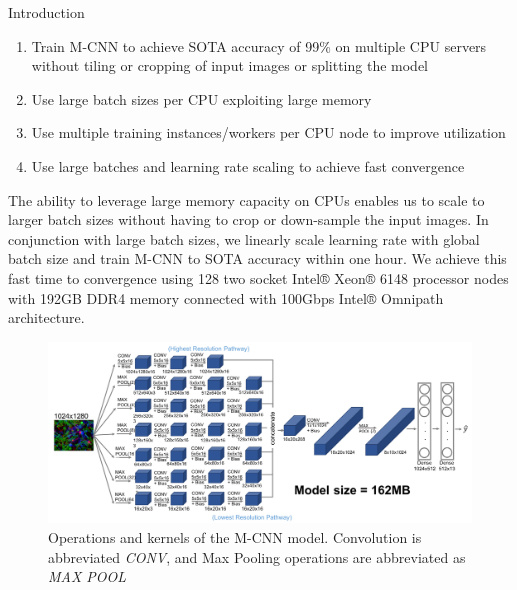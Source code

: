 \begin{section}{Introduction}
\begin{enumerate}
	\item Train M-CNN to achieve SOTA accuracy of 99\% on multiple CPU servers without tiling or cropping of input images or splitting the model
	\item Use large batch sizes per CPU exploiting large memory
	\item Use multiple training instances/workers per CPU node to improve utilization
	\item Use large batches and learning rate scaling to achieve fast convergence
\end{enumerate}

\noindent The ability to leverage large memory capacity on CPUs enables us to scale to larger batch sizes without having to crop or down-sample the input images. In conjunction with large batch sizes, we linearly scale learning rate with global batch size and train M-CNN to SOTA accuracy within one hour. We achieve this fast time to convergence using 128 two socket Intel® Xeon® 6148 processor nodes with 192GB DDR4 memory connected with 100Gbps Intel® Omnipath architecture.

	\begin{figure}[t]
	\centering
	\includegraphics[width=4.75in]{mcnn.png}
	\caption{\textsf{Operations and kernels of the M-CNN model. Convolution is abbreviated \emph{CONV}, and Max Pooling operations are abbreviated as \emph{MAX POOL}}}
	\label{fig:mcnn}
\end{figure}

\end{section}



